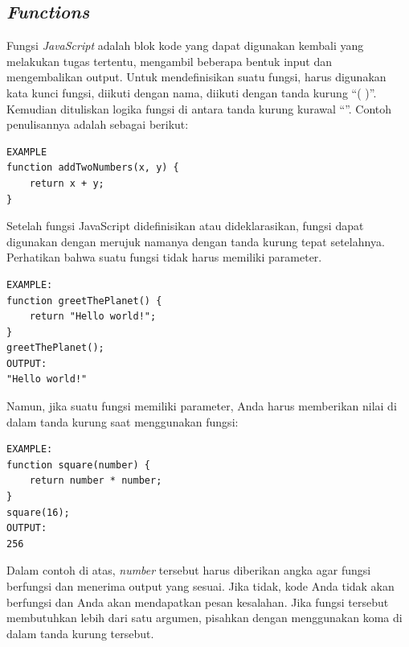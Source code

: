 \subsection{\textit{Functions}}
\label{sec: Functions}
   Fungsi \textit{JavaScript} adalah blok kode yang dapat digunakan kembali yang melakukan tugas tertentu, mengambil beberapa bentuk input dan mengembalikan output\cite{javascriptlearn}. Untuk mendefinisikan suatu fungsi, harus digunakan kata kunci fungsi, diikuti dengan nama, diikuti dengan tanda kurung ``( )''. Kemudian dituliskan logika fungsi di antara tanda kurung kurawal ``{}''. Contoh penulisannya adalah sebagai berikut: 
         \begin{lstlisting}[basicstyle=\ttfamily, frame=single,
            columns=fullflexible, breaklines=true, numbers=none]
EXAMPLE
function addTwoNumbers(x, y) {
    return x + y;
}
    \end{lstlisting}
    Setelah fungsi JavaScript didefinisikan atau dideklarasikan, fungsi dapat digunakan dengan merujuk namanya dengan tanda kurung tepat setelahnya. Perhatikan bahwa suatu fungsi tidak harus memiliki parameter.
         \begin{lstlisting}[basicstyle=\ttfamily, frame=single,
            columns=fullflexible, breaklines=true, numbers=none]
EXAMPLE:
function greetThePlanet() {
    return "Hello world!";
}
greetThePlanet();
OUTPUT:
"Hello world!"
    \end{lstlisting}
    Namun, jika suatu fungsi memiliki parameter, Anda harus memberikan nilai di dalam tanda kurung saat menggunakan fungsi:
         \begin{lstlisting}[basicstyle=\ttfamily, frame=single,
            columns=fullflexible, breaklines=true, numbers=none]
EXAMPLE:
function square(number) {
    return number * number;
}
square(16);
OUTPUT:
256
    \end{lstlisting}
    Dalam contoh di atas, \textit{number} tersebut harus diberikan angka agar fungsi berfungsi dan menerima output yang sesuai. Jika tidak, kode Anda tidak akan berfungsi dan Anda akan mendapatkan pesan kesalahan. Jika fungsi tersebut membutuhkan lebih dari satu argumen, pisahkan dengan menggunakan koma di dalam tanda kurung tersebut.
    
